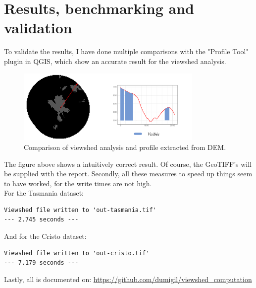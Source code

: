 \documentclass[a4paper]{article}
\begin{document}
\section*{Results, benchmarking and validation}
To validate the results, I have done multiple comparisons with the "Profile Tool" plugin in QGIS, which show an accurate result for the viewshed analysis. 
\begin{figure}[H]    
\centering
\includegraphics[width = 0.8\textwidth]{images/profile_tool copy.png}
\caption{Comparison of viewshed analysis and profile extracted from DEM.}
\label{fig:profiletool}
\end{figure}
The figure above shows a intuitively correct result. 
Of course, the GeoTIFF's will be supplied with the report. 
Secondly, all these measures to speed up things seem to have worked, for the write times are not high.\\
For the Tasmania dataset:
\begin{verbatim}
Viewshed file written to 'out-tasmania.tif'
--- 2.745 seconds ---     
\end{verbatim}
And for the Cristo dataset:
\begin{verbatim}
Viewshed file written to 'out-cristo.tif'
--- 7.179 seconds ---
\end{verbatim}
Lastly, all is documented on:
\url{https://github.com/dumigil/viewshed_computation}



\end{document}
